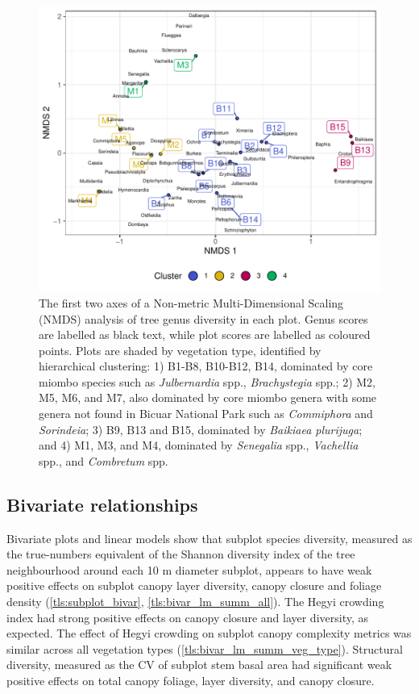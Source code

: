 \begin{refsection}
\begin{figure}
	\includegraphics[width=\linewidth]{img/nmds}
	\caption[NMDS of plots based on genera basal area abundance]{The first two axes of a Non-metric Multi-Dimensional Scaling (NMDS) analysis of tree genus diversity in each plot. Genus scores are labelled as black text, while plot scores are labelled as coloured points. Plots are shaded by vegetation type, identified by hierarchical clustering: 1) B1-B8, B10-B12, B14, dominated by core miombo species such as \textit{Julbernardia} spp., \textit{Brachystegia} spp.; 2) M2, M5, M6, and M7, also dominated by core miombo genera with some genera not found in Bicuar National Park such as \textit{Commiphora} and \textit{Sorindeia}; 3) B9, B13 and B15, dominated by \textit{Baikiaea plurijuga}; and 4) M1, M3, and M4, dominated by \textit{Senegalia} spp., \textit{Vachellia} spp., and \textit{Combretum} spp.}
	\label{tls:nmds}
\end{figure}

\subsection{Bivariate relationships}
\label{tls:ssec:bivar}

Bivariate plots and linear models show that subplot species diversity, measured as the true-numbers equivalent of the Shannon diversity index of the tree neighbourhood around each 10 m diameter subplot, appears to have weak positive effects on subplot canopy layer diversity, canopy closure and foliage density (\autoref{tls:subplot_bivar}, \autoref{tls:bivar_lm_summ_all}). The Hegyi crowding index had strong positive effects on canopy closure and layer diversity, as expected. The effect of Hegyi crowding on subplot canopy complexity metrics was similar across all vegetation types (\autoref{tls:bivar_lm_summ_veg_type}). Structural diversity, measured as the CV of subplot stem basal area had significant weak positive effects on total canopy foliage, layer diversity, and canopy closure. 


\end{refsection}
